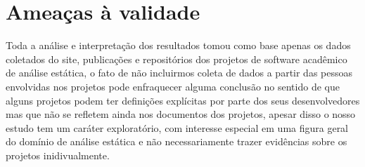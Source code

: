 %
%


\section{Ameaças à validade} %

Toda a análise e interpretação dos resultados tomou como base apenas os dados
coletados do site, publicações e repositórios dos projetos de software
acadêmico de análise estática, o fato de não incluirmos coleta de dados a
partir das pessoas envolvidas nos projetos pode enfraquecer alguma conclusão no
sentido de que alguns projetos podem ter definições explícitas por parte dos
seus desenvolvedores mas que não se refletem ainda nos documentos dos projetos,
apesar disso o nosso estudo tem um caráter exploratório, com interesse especial em
uma figura geral do domínio de análise estática e não necessariamente trazer
evidências sobre os projetos inidivualmente.

